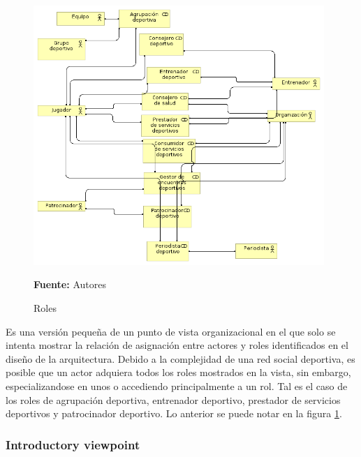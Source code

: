 \begin{figure}[!htb]
  \begin{center}
    \includegraphics[width=11cm]{./imagenes/Archimate/vistas/generales/roles.png}
    \caption{Roles}
    \label{fig:Roles}
    \textbf{Fuente:}  Autores \\
  \end{center}
\end{figure}

Es una versión pequeña de un punto de vista organizacional en el que solo se intenta mostrar la relación de asignación entre actores y roles identificados en el diseño de la arquitectura. Debido a la complejidad de una red social deportiva, es posible que un actor adquiera todos los roles mostrados en la vista, sin embargo, especializandose en unos o accediendo principalmente a un rol. Tal es el caso de los roles de agrupación deportiva, entrenador deportivo, prestador de servicios deportivos y patrocinador deportivo. Lo anterior se puede notar en la figura \ref{fig:Roles}.

\subsubsection{Introductory viewpoint}

